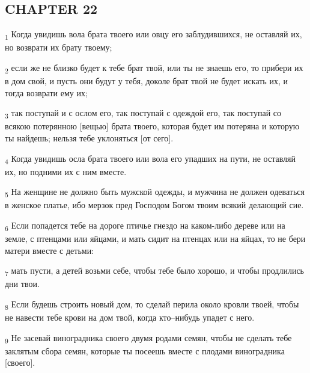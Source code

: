 \subsection{CHAPTER 22}
\begin{tcolorbox}
\textsubscript{1} Когда увидишь вола брата твоего или овцу его заблудившихся, не оставляй их, но возврати их брату твоему;
\end{tcolorbox}
\begin{tcolorbox}
\textsubscript{2} если же не близко будет к тебе брат твой, или ты не знаешь его, то прибери их в дом свой, и пусть они будут у тебя, доколе брат твой не будет искать их, и тогда возврати ему их;
\end{tcolorbox}
\begin{tcolorbox}
\textsubscript{3} так поступай и с ослом его, так поступай с одеждой его, так поступай со всякою потерянною [вещью] брата твоего, которая будет им потеряна и которую ты найдешь; нельзя тебе уклоняться [от сего].
\end{tcolorbox}
\begin{tcolorbox}
\textsubscript{4} Когда увидишь осла брата твоего или вола его упадших на пути, не оставляй их, но подними их с ним вместе.
\end{tcolorbox}
\begin{tcolorbox}
\textsubscript{5} На женщине не должно быть мужской одежды, и мужчина не должен одеваться в женское платье, ибо мерзок пред Господом Богом твоим всякий делающий сие.
\end{tcolorbox}
\begin{tcolorbox}
\textsubscript{6} Если попадется тебе на дороге птичье гнездо на каком-либо дереве или на земле, с птенцами или яйцами, и мать сидит на птенцах или на яйцах, то не бери матери вместе с детьми:
\end{tcolorbox}
\begin{tcolorbox}
\textsubscript{7} мать пусти, а детей возьми себе, чтобы тебе было хорошо, и чтобы продлились дни твои.
\end{tcolorbox}
\begin{tcolorbox}
\textsubscript{8} Если будешь строить новый дом, то сделай перила около кровли твоей, чтобы не навести тебе крови на дом твой, когда кто--нибудь упадет с него.
\end{tcolorbox}
\begin{tcolorbox}
\textsubscript{9} Не засевай виноградника своего двумя родами семян, чтобы не сделать тебе заклятым сбора семян, которые ты посеешь вместе с плодами виноградника [своего].
\end{tcolorbox}
